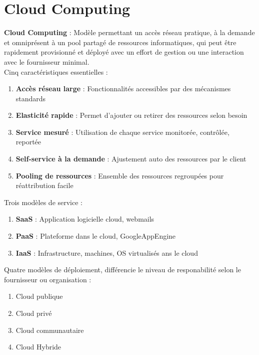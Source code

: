 \documentclass{report}
\begin{document}
	\section{Cloud Computing}

		\textbf{Cloud Computing} : Modèle permettant un accès réseau pratique, à la demande et omniprésent à un pool partagé de ressources informatiques, qui peut être rapidement provisionné et déployé avec un effort de gestion ou une interaction avec le fournisseur minimal.\\

		Cinq caractéristiques essentielles : \\

		\begin{enumerate}
			\item \textbf{Accès réseau large} : Fonctionnalités accessibles par des mécanismes standards
			\item \textbf{Elasticité rapide} : Permet d'ajouter ou retirer des ressources selon besoin
			\item \textbf{Service mesuré} : Utilisation de chaque service monitorée, contrôlée, reportée
			\item \textbf{Self-service à la demande} : Ajustement auto des ressources par le client
			\item \textbf{Pooling de ressources} : Ensemble des ressources regroupées pour réattribution facile\\
		\end{enumerate}

		Trois modèles de service : \\

		\begin{enumerate}
			\item \textbf{SaaS} : Application logicielle cloud, webmails
			\item \textbf{PaaS} : Plateforme dans le cloud, GoogleAppEngine
			\item \textbf{IaaS} : Infrastructure, machines, OS virtualisés ans le cloud\\
		\end{enumerate}

		Quatre modèles de déploiement, différencie le niveau de responabilité selon le fournisseur ou organisation : \\

		\begin{enumerate}
			\item Cloud publique
			\item Cloud privé
			\item Cloud communautaire
			\item Cloud Hybride\\
		\end{enumerate}
\end{document}
